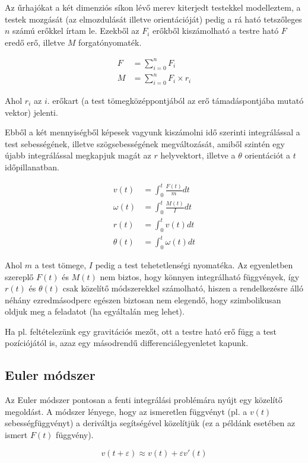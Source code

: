 Az űrhajókat a két dimenziós síkon lévő merev kiterjedt testekkel modelleztem, a
testek mozgását (az elmozdulását illetve orientációját) pedig a rá ható
tetszőleges $n$ számú erőkkel írtam le. Ezekből az $F_i$ erőkből kiszámolható a
testre ható $F$ eredő erő, illetve $M$ forgatónyomaték.

\begin{align*}
F &= \sum_{i=0}^{n} F_i \\
M &= \sum_{i=0}^{n} F_i \times r_i
\end{align*}

Ahol $r_i$ az $i$. erőkart (a test tömegközéppontjából az erő támadáspontjába
mutató vektor) jelenti.

Ebből a két mennyiségből képesek vagyunk kiszámolni idő szerinti integrálással a
test sebességének, illetve szögsebességének megváltozását, amiből szintén egy
újabb integrálással megkapjuk magát az $r$ helyvektort, illetve a $\theta$
orientációt a $t$ időpillanatban.

\begin{align*}
v(t) &= \int_{0}^{t} \frac{F(t)}{m} dt \\
\omega(t) &= \int_{0}^{t} \frac{M(t)}{I} dt \\
r(t) &= \int_{0}^{t} v(t) dt \\
\theta(t) &= \int_{0}^{t} \omega(t) dt
\end{align*}

Ahol $m$ a test tömege, $I$ pedig a test tehetetlenségi nyomatéka.  Az
egyenletben szereplő $F(t)$ és $M(t)$ nem biztos, hogy könnyen integrálható
függvények, így $r(t)$ és $\theta(t)$ csak közelítő módszerekkel számolható,
hiszen a rendelkezésre álló néhány ezredmásodperc egészen biztosan nem elegendő,
hogy szimbolikusan oldjuk meg a feladatot (ha egyáltalán meg lehet).

Ha pl. feltételezünk egy gravitációs mezőt, ott a testre ható erő függ a test
pozíciójától is, azaz egy másodrendű differenciálegyenletet kapunk.

\subsection{Euler módszer}

Az Euler módszer pontosan a fenti integrálási problémára nyújt egy közelítő
megoldást. A módszer lényege, hogy az ismeretlen függvényt (pl. a $v(t)$
sebességfüggvényt) a deriváltja segítségével közelítjük (ez a példánk esetében az
ismert $F(t)$ függvény).

\[
  v(t + \varepsilon) \approx v(t) + \varepsilon v'(t)
\]

